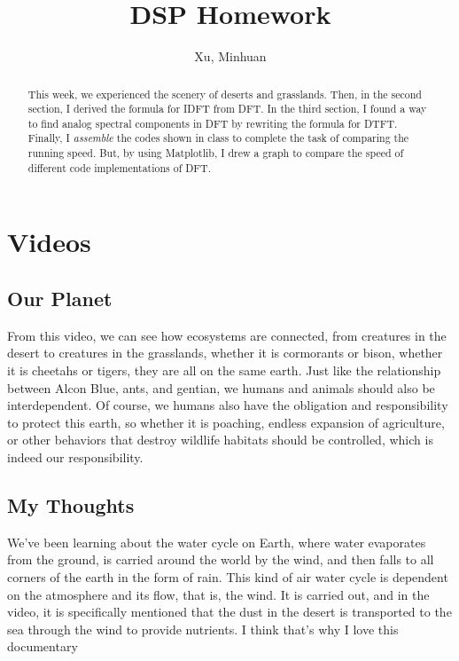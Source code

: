 \documentclass{article}
\begin{document}
\title{DSP Homework}
\author{Xu, Minhuan}
\maketitle
\tableofcontents
\begin{abstract}
This week, we experienced the scenery of deserts and grasslands. Then, in the second section, I derived the formula for IDFT from DFT. In the third section, I found a way to find analog spectral components in DFT by rewriting the formula for DTFT. Finally, I \emph{assemble} the codes shown in class to complete the task of comparing the running speed. But, by using Matplotlib, I drew a graph to compare the speed of different code implementations of DFT.
\end{abstract}

\section{Videos}
\subsection{Our Planet}
From this video, we can see how ecosystems are connected, from creatures in the desert to creatures in the grasslands, whether it is cormorants or bison, whether it is cheetahs or tigers, they are all on the same earth. Just like the relationship between Alcon Blue, ants, and gentian, we humans and animals should also be interdependent. Of course, we humans also have the obligation and responsibility to protect this earth, so whether it is poaching, endless expansion of agriculture, or other behaviors that destroy wildlife habitats should be controlled, which is indeed our responsibility.

\subsection{My Thoughts}
We've been learning about the water cycle on Earth, where water evaporates from the ground, is carried around the world by the wind, and then falls to all corners of the earth in the form of rain. This kind of air water cycle is dependent on the atmosphere and its flow, that is, the wind. It is carried out, and in the video, it is specifically mentioned that the dust in the desert is transported to the sea through the wind to provide nutrients. I think that's why I love this documentary
\end{document}
